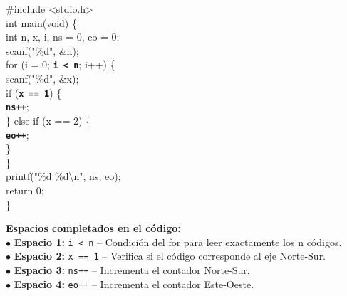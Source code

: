 \documentclass[10pt, a4paper]{article}
\newcommand{\codigoResaltado}[1]{\colorbox{fondoresaltado}{\textbf{\color{verdecompletado}\texttt{#1}}}}
\begin{document}
\vspace{1.5mm}
\begin{tcolorbox}[colback=fondocodigo, colframe=azulborde, leftrule=2mm, arc=1mm, boxrule=0.5pt, top=1.5mm, bottom=1.5mm]
\small\ttfamily
\#include <stdio.h>\\[1mm]
int main(void) \{\\
\hspace*{4mm}int n, x, i, ns = 0, eo = 0;\\
\hspace*{4mm}scanf("\%d", \&n);\\
\hspace*{4mm}for (i = 0; \codigoResaltado{i < n}; i++) \{\\
\hspace*{8mm}scanf("\%d", \&x);\\
\hspace*{8mm}if (\codigoResaltado{x == 1}) \{\\
\hspace*{12mm}\codigoResaltado{ns++};\\
\hspace*{8mm}\} else if (x == 2) \{\\
\hspace*{12mm}\codigoResaltado{eo++};\\
\hspace*{8mm}\}\\
\hspace*{4mm}\}\\
\hspace*{4mm}printf("\%d \%d\textbackslash n", ns, eo);\\
\hspace*{4mm}return 0;\\
\}
\end{tcolorbox}

\vspace{1mm}
\begin{tcolorbox}[colback=fondoresaltado, colframe=bordeverde, arc=1mm, boxrule=0.5pt, top=1.2mm, bottom=1.2mm]
\footnotesize
\textbf{Espacios completados en el código:}\\
$\bullet$ \textbf{Espacio 1:} \texttt{i < n} -- Condición del for para leer exactamente los n códigos.\\
$\bullet$ \textbf{Espacio 2:} \texttt{x == 1} -- Verifica si el código corresponde al eje Norte-Sur.\\
$\bullet$ \textbf{Espacio 3:} \texttt{ns++} -- Incrementa el contador Norte-Sur.\\
$\bullet$ \textbf{Espacio 4:} \texttt{eo++} -- Incrementa el contador Este-Oeste.
\end{tcolorbox}
\end{document}
